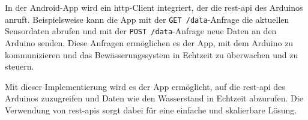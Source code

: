 In der Android-App wird ein \ac{http}-Client integriert, der die \ac{rest}-\ac{api} des Arduinos anruft. Beispielsweise kann die App mit der \texttt{GET /data}-Anfrage die aktuellen Sensordaten abrufen und mit der \texttt{POST /data}-Anfrage neue Daten an den Arduino senden. Diese Anfragen ermöglichen es der App, mit dem Arduino zu kommunizieren und das Bewässerungssystem in Echtzeit zu überwachen und zu steuern.

Mit dieser Implementierung wird es der App ermöglicht, auf die \ac{rest}-\ac{api} des Arduinos zuzugreifen und Daten wie den Wasserstand in Echtzeit abzurufen. Die Verwendung von \ac{rest}-\acp{api} sorgt dabei für eine einfache und skalierbare Lösung.